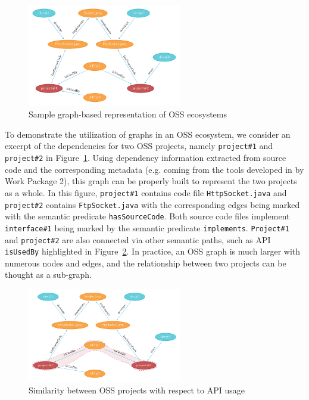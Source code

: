 \begin{figure}[t!]
	\centering
	\includegraphics[width=0.60\textwidth]{images/OSSGraph1.pdf}
	\caption{Sample graph-based representation of OSS ecosystems}
	\label{fig:OSSGraph1}
\end{figure}


To demonstrate the utilization of graphs in an OSS ecosystem, we consider an excerpt of the dependencies for two OSS projects, namely \texttt{project\#1} and \texttt{project\#2} in Figure~\ref{fig:OSSGraph1}. Using dependency information extracted from source code and the corresponding metadata (e.g. coming from the tools developed in by Work Package 2), this graph can be properly built to represent the two projects as a whole. In this figure, \texttt{project\#1} contains code file \texttt{HttpSocket.java} and \texttt{project\#2} contains \texttt{FtpSocket.java} with the corresponding edges being marked with the semantic predicate \texttt{hasSourceCode}. Both source code files implement \texttt{interface\#1} being marked by the semantic predicate \texttt{implements}. \texttt{Project\#1} and \texttt{project\#2} are also connected via other semantic paths, such as API \texttt{isUsedBy} highlighted in Figure~\ref{fig:OSSGraph3}. In practice, an OSS graph is much larger with numerous nodes and edges, and the relationship between two projects can be thought as a sub-graph. 

\begin{figure}[h!]
	\centering
	\includegraphics[width=0.60\textwidth]{images/OSSGraph3.pdf}
	\caption{Similarity between OSS projects with respect to API usage}
	\label{fig:OSSGraph3}
\end{figure}




